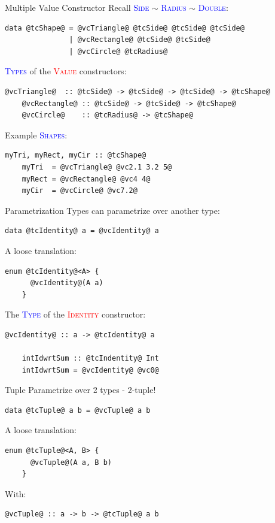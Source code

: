 \documentclass[xcolor={usenames,dvipsnames}]{beamer}
\newcommand{\htycon}[1]{\textcolor{Blue}{\textsc{#1}}}
\newcommand{\hvalcon}[1]{\textcolor{Red}{\textsc{#1}}}
\begin{document}
\begin{frame}[fragile]{Multiple Value Constructor}
  Recall \htycon{Side} $\sim$ \htycon{Radius} $\sim$ \htycon{Double}:
  \begin{lstlisting}[style=hask]
    data @tcShape@ = @vcTriangle@ @tcSide@ @tcSide@ @tcSide@
               | @vcRectangle@ @tcSide@ @tcSide@
               | @vcCircle@ @tcRadius@
  \end{lstlisting}

  \pause
  \htycon{Types} of the \hvalcon{Value} constructors:
  \begin{lstlisting}[style=hask]
    @vcTriangle@  :: @tcSide@ -> @tcSide@ -> @tcSide@ -> @tcShape@
    @vcRectangle@ :: @tcSide@ -> @tcSide@ -> @tcShape@
    @vcCircle@    :: @tcRadius@ -> @tcShape@
  \end{lstlisting}

  \pause
  Example \htycon{Shapes}:
  \begin{lstlisting}[style=hask]
    myTri, myRect, myCir :: @tcShape@
    myTri  = @vcTriangle@ @vc2.1 3.2 5@
    myRect = @vcRectangle@ @vc4 4@
    myCir  = @vcCircle@ @vc7.2@
  \end{lstlisting}
\end{frame}

\begin{frame}[fragile]{Parametrization}
  Types can parametrize over another type:
  \begin{lstlisting}[style=hask]
    data @tcIdentity@ a = @vcIdentity@ a
  \end{lstlisting}

  \pause
  A loose translation:
  \begin{lstlisting}[style=hask]
    enum @tcIdentity@<A> {
      @vcIdentity@(A a)
    }
  \end{lstlisting}

  \pause
  The \htycon{Type} of the \hvalcon{Identity} constructor:
  \begin{lstlisting}[style=hask]
    @vcIdentity@ :: a -> @tcIdentity@ a

    intIdwrtSum :: @tcIndentity@ Int
    intIdwrtSum = @vcIdentity@ @vc0@
  \end{lstlisting}
\end{frame}

\begin{frame}[fragile]{Tuple}
  Parametrize over 2 types - 2-tuple!
  \begin{lstlisting}[style=hask]
    data @tcTuple@ a b = @vcTuple@ a b
  \end{lstlisting}

  \pause
  A loose translation:
  \begin{lstlisting}[style=hask]
    enum @tcTuple@<A, B> {
      @vcTuple@(A a, B b)
    }
  \end{lstlisting}

  \pause
  With:
  \begin{lstlisting}[style=hask]
    @vcTuple@ :: a -> b -> @tcTuple@ a b
  \end{lstlisting}
\end{frame}
\end{document}
